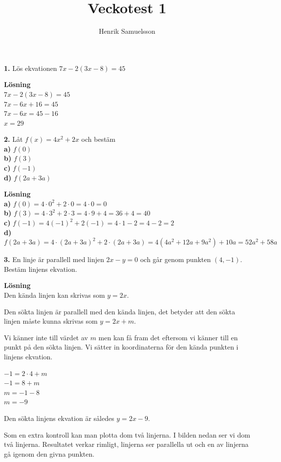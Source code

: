 \documentclass{article}
\begin{document}
\title{Veckotest 1}
\author{Henrik Samuelsson}
\maketitle
\textbf{1.} Lös ekvationen $7x-2(3x-8)=45$

\textbf{Lösning}\\
$7x-2(3x-8)=45$\\
$7x-6x+16=45$\\
$7x-6x=45-16$\\
$x=29$

\textbf{2.} Låt $f(x)=4x^{2}+2x$ och bestäm\\
\textbf{a)} $f(0)$\\
\textbf{b)} $f(3)$\\
\textbf{c)} $f(-1)$\\
\textbf{d)} $f(2a + 3a)$

\textbf{Lösning}\\
\textbf{a)} $f(0)=4\cdot0^2+2\cdot0=4\cdot0=0$\\
\textbf{b)} $f(3)=4\cdot3^2+2\cdot3=4\cdot9+4=36+4=40$\\
\textbf{c)} $f(-1)=4(-1)^2+2(-1)=4\cdot1-2=4-2=2$\\
\textbf{d)} $f(2a+3a)=4\cdot(2a+3a)^2+2\cdot(2a+3a)=4(4a^2+12a+9a^2)+10a=52a^2+58a$

\textbf{3.} En linje är parallell med linjen $2x - y = 0$ och går genom punkten $(4, -1)$. Bestäm linjens ekvation.

\textbf{Lösning}\\
Den kända linjen kan skrivas som $y = 2x$.

Den sökta linjen är parallell med den kända linjen, det betyder att den sökta linjen måste kunna skrivas som $y = 2x + m$.

Vi känner inte till värdet av $m$ men kan få fram det eftersom vi känner till en punkt på den sökta linjen. Vi sätter in koordinaterna för den kända punkten i linjens ekvation.

$-1 = 2 \cdot 4 + m$\\
$-1 = 8 + m$\\
$m = -1 - 8$\\
$m = -9$

Den sökta linjens ekvation är således $y = 2x - 9$.

Som en extra kontroll kan man plotta dom två linjerna. I bilden nedan ser vi dom två linjerna. Resultatet verkar rimligt, linjerna ser parallella ut och en av linjerna gå igenom den givna punkten. 
\end{document}
